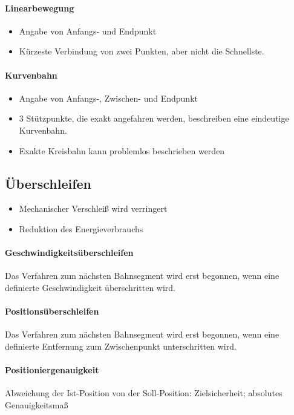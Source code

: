 \paragraph{Linearbewegung}
\begin{itemize}
	\item Angabe von Anfangs- und Endpunkt
	\item Kürzeste Verbindung von zwei Punkten, aber nicht die Schnellste.
\end{itemize}
\paragraph{Kurvenbahn}
\begin{itemize}
	\item Angabe von Anfangs-, Zwischen- und Endpunkt
	\item 3 Stützpunkte, die exakt angefahren werden, beschreiben eine eindeutige Kurvenbahn.
	\item Exakte Kreisbahn kann problemlos beschrieben werden
\end{itemize}
\subsection{Überschleifen}
\begin{itemize}
	\item Mechanischer Verschleiß wird verringert
	\item Reduktion des Energieverbrauchs
\end{itemize}
\paragraph{Geschwindigkeitsüberschleifen}
Das Verfahren zum nächsten Bahnsegment wird erst begonnen, wenn eine definierte Geschwindigkeit überschritten wird.
\paragraph{Positionsüberschleifen}
Das Verfahren zum nächsten Bahnsegment wird erst begonnen, wenn eine definierte Entfernung zum Zwischenpunkt unterschritten wird.
\paragraph{Positioniergenauigkeit}
Abweichung der Ist-Position von der Soll-Position: Zielsicherheit; absolutes Genauigkeitsmaß

